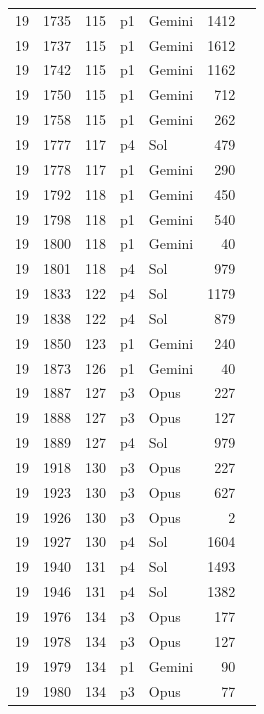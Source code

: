 \begin{longtable}{r r r l l r L{2.2in}}
19 & 1735 & 115 & p1 & Gemini & 1412 &  \\
19 & 1737 & 115 & p1 & Gemini & 1612 &  \\
19 & 1742 & 115 & p1 & Gemini & 1162 &  \\
19 & 1750 & 115 & p1 & Gemini & 712 &  \\
19 & 1758 & 115 & p1 & Gemini & 262 &  \\
19 & 1777 & 117 & p4 & Sol & 479 &  \\
19 & 1778 & 117 & p1 & Gemini & 290 &  \\
19 & 1792 & 118 & p1 & Gemini & 450 &  \\
19 & 1798 & 118 & p1 & Gemini & 540 &  \\
19 & 1800 & 118 & p1 & Gemini & 40 &  \\
19 & 1801 & 118 & p4 & Sol & 979 &  \\
19 & 1833 & 122 & p4 & Sol & 1179 &  \\
19 & 1838 & 122 & p4 & Sol & 879 &  \\
19 & 1850 & 123 & p1 & Gemini & 240 &  \\
19 & 1873 & 126 & p1 & Gemini & 40 &  \\
19 & 1887 & 127 & p3 & Opus & 227 &  \\
19 & 1888 & 127 & p3 & Opus & 127 &  \\
19 & 1889 & 127 & p4 & Sol & 979 &  \\
19 & 1918 & 130 & p3 & Opus & 227 &  \\
19 & 1923 & 130 & p3 & Opus & 627 &  \\
19 & 1926 & 130 & p3 & Opus & 2 &  \\
19 & 1927 & 130 & p4 & Sol & 1604 &  \\
19 & 1940 & 131 & p4 & Sol & 1493 &  \\
19 & 1946 & 131 & p4 & Sol & 1382 &  \\
19 & 1976 & 134 & p3 & Opus & 177 &  \\
19 & 1978 & 134 & p3 & Opus & 127 &  \\
19 & 1979 & 134 & p1 & Gemini & 90 &  \\
19 & 1980 & 134 & p3 & Opus & 77 &  \\

\end{longtable}
